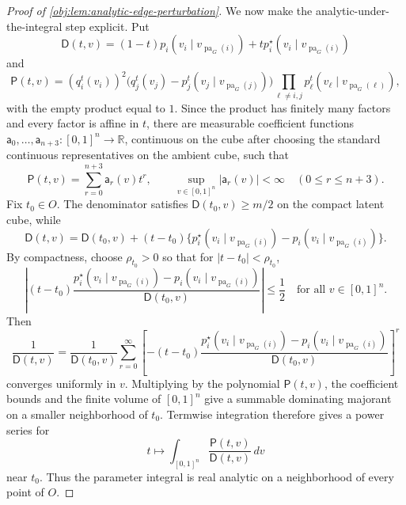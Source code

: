 \documentclass[11pt]{article}
\begin{document}
\begin{proof}[Proof of \cref{obj:lem:analytic-edge-perturbation}]
We now make the analytic-under-the-integral step explicit.  Put
\[
\mathsf D(t,v)=(1-t)p_i(v_i\mid v_{\operatorname{pa}_G(i)})
+t p_i^\star(v_i\mid v_{\operatorname{pa}_G(i)})
\]
and
\[
\mathsf P(t,v)
=(q_i^t(v_i))^2\bigl(q_j^t(v_j)-p_j^t(v_j\mid v_{\operatorname{pa}_G(j)})\bigr)
\prod_{\ell\ne i,j}p_\ell^t(v_\ell\mid v_{\operatorname{pa}_G(\ell)}),
\]
with the empty product equal to \(1\).  Since the product has finitely many factors and every factor is affine in \(t\), there are measurable coefficient functions \(\mathsf a_0,\ldots,\mathsf a_{n+3}:[0,1]^n\to\mathbb R\), continuous on the cube after choosing the standard continuous representatives on the ambient cube, such that
\[
\mathsf P(t,v)=\sum_{r=0}^{n+3}\mathsf a_r(v)t^r,
\qquad
\sup_{v\in[0,1]^n}|\mathsf a_r(v)|<\infty
\quad(0\le r\le n+3).
\]
Fix \(t_0\in O\).  The denominator satisfies \(\mathsf D(t_0,v)\ge m/2\) on the compact latent cube, while
\[
\mathsf D(t,v)=\mathsf D(t_0,v)+(t-t_0)
\{p_i^\star(v_i\mid v_{\operatorname{pa}_G(i)})-p_i(v_i\mid v_{\operatorname{pa}_G(i)})\}.
\]
By compactness, choose \(\rho_{t_0}>0\) so that for \(|t-t_0|<\rho_{t_0}\),
\[
\left|
(t-t_0)\frac{p_i^\star(v_i\mid v_{\operatorname{pa}_G(i)})
-p_i(v_i\mid v_{\operatorname{pa}_G(i)})}{\mathsf D(t_0,v)}
\right|\le \frac12
\quad\text{for all }v\in[0,1]^n.
\]
Then
\[
\frac1{\mathsf D(t,v)}
=\frac1{\mathsf D(t_0,v)}
\sum_{r=0}^\infty
\left[-(t-t_0)\frac{p_i^\star(v_i\mid v_{\operatorname{pa}_G(i)})
-p_i(v_i\mid v_{\operatorname{pa}_G(i)})}{\mathsf D(t_0,v)}\right]^r
\]
converges uniformly in \(v\).  Multiplying by the polynomial \(\mathsf P(t,v)\), the coefficient bounds and the finite volume of \([0,1]^n\) give a summable dominating majorant on a smaller neighborhood of \(t_0\).  Termwise integration therefore gives a power series for
\[
t\longmapsto \int_{[0,1]^n}\frac{\mathsf P(t,v)}{\mathsf D(t,v)}\,dv
\]
near \(t_0\).  Thus the parameter integral is real analytic on a neighborhood of every point of \(O\). %


\end{proof}
\end{document}
